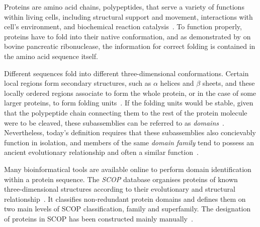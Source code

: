 

Proteins are amino acid chains, polypeptides, that serve a variety of functions within
living cells, including structural support and movement, interactions with cell's
environment, and biochemical reaction catalysis~\cite{alberts2018molecular}.
To function properly, proteins have to fold into their native conformation, and as
demonstrated by \citet{anfinsen1961kinetics} on bovine pancreatic ribonuclease, the
information for correct folding is contained in the amino acid sequence itself.

Different sequences fold into different three-dimensional conformations.
Certain local regions form secondary structures, such as $\alpha$ helices and $\beta$
sheets, and these locally ordered regions associate to form the whole protein, or in the
case of some larger proteins, to form folding units~\cite{levitt1975computer}.
If the folding units would be stable, given that the polypeptide chain connecting them
to the rest of the protein molecule were to be cleaved, these subassemblies can be
referred to as \emph{domains}~\cite{goldberg1969tertiary, levitt1975computer}.
Nevertheless, today's definition requires that these subassemblies also concievably
function in isolation, and members of the same \emph{domain family} tend to possess an
ancient evolutionary relationship and often a similar function~\cite{ponting2002natural}.

Many bioinformatical tools are available online to perform domain identification within a
protein sequence.
The \emph{SCOP} database organises proteins of known three-dimensional structures according to their evolutionary and structural relationship~\cite{murzin1995scop}.
It classifies non-redundant protein domains and defines them on two main levels of SCOP
classification, family and superfamily.
The designation of proteins in SCOP has been constructed mainly
manually~\cite{andreeva2020scop}.

